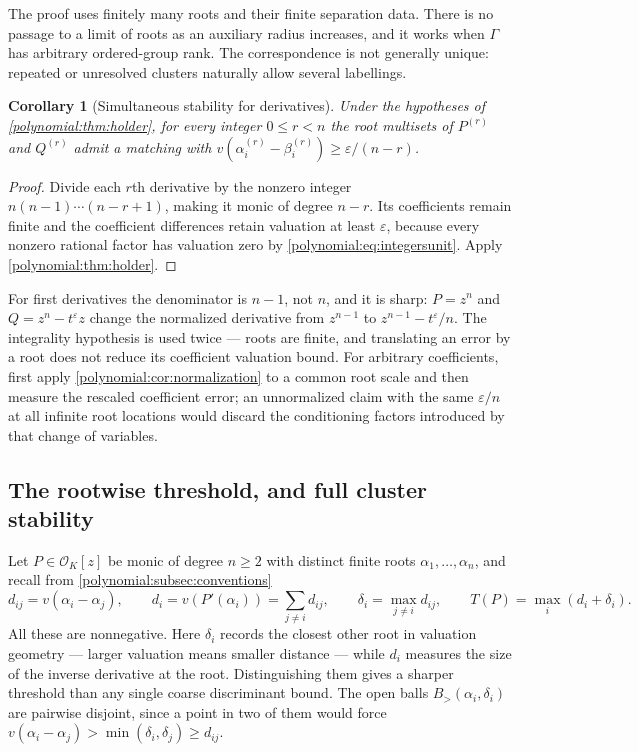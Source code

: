 \documentclass[11pt,letterpaper]{article}
\numberwithin{equation}{section}
\newtheorem{corollary}[theorem]{Corollary}
\theoremstyle{definition}
\theoremstyle{remark}\newtheorem{remark}[theorem]{Remark}
\newcommand{\OO}{\mathcal O}
\newcommand{\Bgt}[2]{B_{>}(#1,#2)}
\begin{document}
The proof uses finitely many roots and their finite separation data. There is
no passage to a limit of roots as an auxiliary radius increases, and it works
when $\Gamma$ has arbitrary ordered-group rank. The correspondence is not
generally unique: repeated or unresolved clusters naturally allow several
labellings.

\begin{corollary}[Simultaneous stability for derivatives]
\label{polynomial:cor:derivativeholder}
Under the hypotheses of \cref{polynomial:thm:holder}, for every integer
$0\le r<n$ the root multisets of $P^{(r)}$ and $Q^{(r)}$ admit a matching with
$v(\alpha_i^{(r)}-\beta_i^{(r)})\ge\varepsilon/(n-r)$.
\end{corollary}
\begin{proof}
Divide each $r$th derivative by the nonzero integer $n(n-1)\cdots(n-r+1)$,
making it monic of degree $n-r$. Its coefficients remain finite and the
coefficient differences retain valuation at least $\varepsilon$, because every
nonzero rational factor has valuation zero by
\eqref{polynomial:eq:integersunit}. Apply \cref{polynomial:thm:holder}.
\end{proof}

For first derivatives the denominator is $n-1$, not $n$, and it is sharp:
$P=z^n$ and $Q=z^n-t^\varepsilon z$ change the normalized derivative from
$z^{n-1}$ to $z^{n-1}-t^\varepsilon/n$. The integrality hypothesis is used
twice --- roots are finite, and translating an error by a root does not reduce
its coefficient valuation bound. For arbitrary coefficients, first apply
\cref{polynomial:cor:normalization} to a common root scale and then measure
the rescaled coefficient error; an unnormalized claim with the same
$\varepsilon/n$ at all infinite root locations would discard the conditioning
factors introduced by that change of variables.

\subsection{The rootwise threshold, and full cluster stability}
Let $P\in\OO_K[z]$ be monic of degree $n\ge2$ with distinct finite roots
$\alpha_1,\ldots,\alpha_n$, and recall from
\cref{polynomial:subsec:conventions}
\begin{equation}\label{polynomial:eq:stabilitydata}
 d_{ij}=v(\alpha_i-\alpha_j),\qquad
 d_i=v(P'(\alpha_i))=\sum_{j\ne i}d_{ij},\qquad
 \delta_i=\max_{j\ne i}d_{ij},\qquad
 T(P)=\max_i(d_i+\delta_i).
\end{equation}
All these are nonnegative. Here $\delta_i$ records the closest other root in
valuation geometry --- larger valuation means smaller distance --- while $d_i$
measures the size of the inverse derivative at the root. Distinguishing them
gives a sharper threshold than any single coarse discriminant bound. The open
balls $\Bgt{\alpha_i}{\delta_i}$ are pairwise disjoint, since a point in two of
them would force $v(\alpha_i-\alpha_j)>\min(\delta_i,\delta_j)\ge d_{ij}$.
\end{document}
